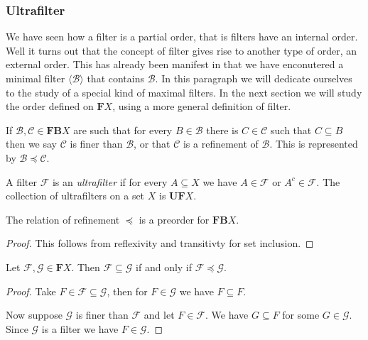 \documentclass [12pt]{book}
\begin{document}
\subsubsection{Ultrafilter}

We have seen how a filter is a partial order, that is filters have an internal order. Well it turns out that the concept of filter gives rise to another type of order, an external order. This has already been manifest in that we have enconutered a minimal filter $\langle\mathcal{B}\rangle$ that contains $\mathcal B$. In this paragraph we will dedicate ourselves to the study of a special kind of maximal filters. In the next section we will study the order defined on $\textbf{F}X$, using a more general definition of filter.

\begin{definition}If $\mathcal B,\mathcal C\in\textbf{FB}X$ are such that for every $B\in\mathcal B$ there is $C\in\mathcal C$ such that $C\subseteq B$ then we say $\mathcal C$ is finer than $\mathcal B$, or that $\mathcal C$ is a refinement of $\mathcal B$. This is represented by $\mathcal B\preceq\mathcal C$.

A filter $\mathcal{F}$ is an \textit{ultrafilter} if for every $A\subseteq X$ we have $A\in\mathcal{F}$ or $A^c\in\mathcal{F}$. The collection of ultrafilters on a set $X$ is $\textbf{UF}X$.\end{definition}

\begin{proposition}The relation of refinement $\preceq$ is a preorder for $\textbf{FB}X$.\end{proposition}

\begin{proof}This follows from reflexivity and transitivty for set inclusion.\end{proof}

\begin{proposition}Let $\mathcal F,\mathcal G\in\textbf{F}X$. Then $\mathcal F\subseteq\mathcal G$ if and only if $\mathcal F\preceq\mathcal G$.\end{proposition}

\begin{proof}Take $F\in\mathcal F\subseteq\mathcal G$, then for $F\in\mathcal G$ we have $F\subseteq F$.

Now suppose $\mathcal G$ is finer than $\mathcal F$ and let $F\in\mathcal F$. We have $G\subseteq F$ for some $G\in\mathcal G$. Since $\mathcal G$ is a filter we have $F\in\mathcal G$.\end{proof}
\end{document}

